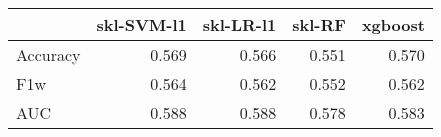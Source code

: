 \begin{tabular}{lrrrr}
\toprule
{} &  skl-SVM-l1 &  skl-LR-l1 &  skl-RF &  xgboost \\
\midrule
Accuracy &       0.569 &      0.566 &   0.551 &    0.570 \\
F1w      &       0.564 &      0.562 &   0.552 &    0.562 \\
AUC      &       0.588 &      0.588 &   0.578 &    0.583 \\
\bottomrule
\end{tabular}
